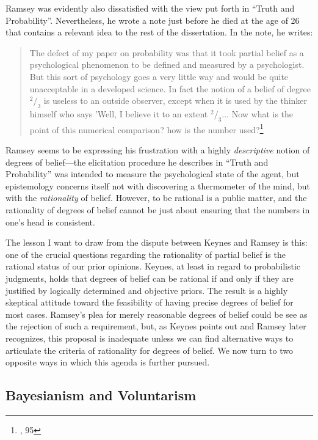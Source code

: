 Ramsey was evidently also dissatisfied with the view put forth in ``Truth and Probability''. Nevertheless, he wrote a note just before he died at the age of 26 that contains a relevant idea to the rest of the dissertation. In the note, he writes:

\begin{quote}
The defect of my paper on probability was that it took partial belief as a psychological phenomenon to be defined and measured by a psychologist. But this sort of psychology goes a very little way and would be quite unacceptable in a developed science. In fact the notion of a belief of degree $^2/_3$ is useless to an outside observer, except when it is used by the thinker himself who says 'Well, I believe it to an extent $^2/_3$... Now what is the point of this numerical comparison? how is the number used?\footnote{\cite{ramsey}, 95}
\end{quote}

Ramsey seems to be expressing his frustration with a highly \emph{descriptive} notion of degrees of belief---the elicitation procedure he describes in ``Truth and Probability'' was intended to measure the psychological state of the agent, but epistemology concerns itself not with discovering a thermometer of the mind, but with the \emph{rationality} of belief. However, to be rational is a public matter, and the rationality of degrees of belief cannot be just about ensuring that the numbers in one's head is consistent. 

The lesson I want to draw from the dispute between Keynes and Ramsey is
this: one of the crucial questions regarding the rationality of partial
belief is the rational status of our prior opinions. Keynes, at least in
regard to probabilistic judgments, holds that degrees of belief can be
rational if and only if they are justified by logically
determined and objective priors. The result is a highly skeptical
attitude toward the feasibility of having precise degrees of belief for
most cases. Ramsey's plea for merely reasonable degrees of belief could
be see as the rejection of such a requirement, but, as Keynes points out and Ramsey later recognizes,
this proposal is inadequate unless we can find alternative ways to
articulate the criteria of rationality for degrees of belief. We now turn to two opposite ways in which this agenda is further pursued.



\hypertarget{bayesianism-and-voluntarism}{%
\subsection{Bayesianism and
Voluntarism}\label{sec:bayesianism-and-voluntarism}}

